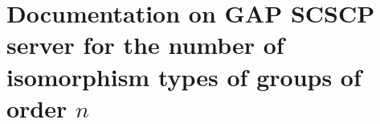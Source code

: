 \documentclass{deliverablereport}
\begin{document}
\section{Documentation on GAP SCSCP server for the number of isomorphism types of groups of order $n$}

%
%
\end{document}

